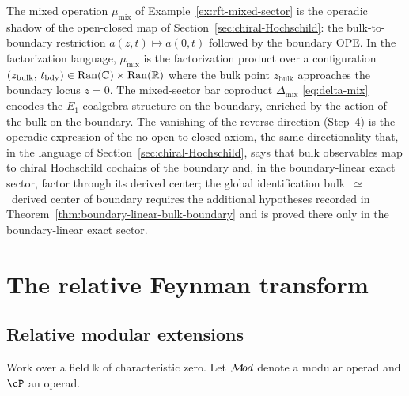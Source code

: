 \begin{remark}
\label{rem:mixed-sector-open-closed}
The mixed operation $\mu_{\mathrm{mix}}$ of
Example~\ref{ex:rft-mixed-sector} is the operadic shadow of
the open-closed map of
Section~\ref{sec:chiral-Hochschild}: the bulk-to-boundary restriction
$a(z,t) \mapsto a(0,t)$ followed by the boundary OPE. In the
factorization language, $\mu_{\mathrm{mix}}$ is the
factorization product over a configuration
$(z_{\mathrm{bulk}},\, t_{\mathrm{bdy}}) \in
\operatorname{Ran}(\mathbb{C}) \times \operatorname{Ran}(\mathbb{R})$ where the bulk point
$z_{\mathrm{bulk}}$ approaches the boundary locus $z = 0$.
The mixed-sector bar coproduct $\Delta_{\mathrm{mix}}$
\eqref{eq:delta-mix} encodes the $E_1$-coalgebra structure on
the boundary, enriched by the action of the bulk on the
boundary. The vanishing of the reverse direction
(Step~4) is the operadic expression of the no-open-to-closed
axiom, the same directionality that, in the language of
Section~\ref{sec:chiral-Hochschild}, says that bulk observables
map to chiral Hochschild cochains of the boundary and, in the
boundary-linear exact sector, factor through its derived center; the global identification
bulk~$\simeq$~derived center of boundary requires the additional
hypotheses recorded in
Theorem~\ref{thm:boundary-linear-bulk-boundary} and is proved
there only in the boundary-linear exact sector.
\end{remark}


\section{The relative Feynman transform}
\label{sec:relative-ft-definition}

\subsection{Relative modular extensions}

Work over a field $\mathbb{k}$ of characteristic zero.
Let $\mathcal{M}\!od$ denote a modular operad and $\cP$ an operad.

